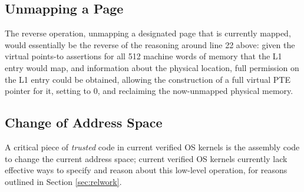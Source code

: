 \subsection{Unmapping a Page}
The reverse operation, unmapping a designated page that is currently mapped,
would essentially be the reverse of
the reasoning around line 22 above: given the virtual points-to assertions for all 512
machine words of memory that the L1 entry would map,
and information about the physical location, 
full permission on the L1 entry could be obtained, allowing the construction of a
full virtual PTE pointer for it, setting to 0, and reclaiming the now-unmapped physical memory.

\subsection{Change of Address Space}
A critical piece of \emph{trusted} code in current verified OS kernels is the assembly code to change the current address space; current verified OS kernels currently 
lack effective ways to specify and reason about this low-level operation, for reasons outlined in Section \ref{sec:relwork}.
